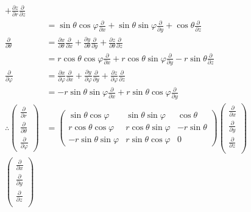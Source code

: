 \documentclass[12pt, UTF8, AutoFakeBold]{ctexart} %
\begin{document}
\begin{align*}
    + \frac{\partial z}{\partial r}\frac{\partial}{\partial z}\\
    &= \sin\theta\cos\varphi\frac{\partial}{\partial x}
    + \sin\theta\sin\varphi\frac{\partial}{\partial y}
    + \cos\theta\frac{\partial}{\partial z}\\
    \frac{\partial}{\partial\theta} &= \frac{\partial x}{\partial\theta}\frac{\partial}{\partial x}
    + \frac{\partial y}{\partial\theta}\frac{\partial}{\partial y}
    + \frac{\partial z}{\partial\theta}\frac{\partial}{\partial z}\\
    &= r\cos\theta\cos\varphi\frac{\partial}{\partial x}
    + r\cos\theta\sin\varphi\frac{\partial}{\partial y}
    - r\sin\theta\frac{\partial}{\partial z}\\
    \frac{\partial}{\partial\varphi} &= \frac{\partial x}{\partial\varphi}\frac{\partial}{\partial x}
    + \frac{\partial y}{\partial\varphi}\frac{\partial}{\partial y}
    + \frac{\partial z}{\partial\varphi}\frac{\partial}{\partial z}\\
    &= -r\sin\theta\sin\varphi\frac{\partial}{\partial x}
    + r\sin\theta\cos\varphi\frac{\partial}{\partial y}\\
    \therefore
    \begin{pmatrix}
        \frac{\partial}{\partial r}\\
        \frac{\partial}{\partial\theta}\\
        \frac{\partial}{\partial\varphi}
    \end{pmatrix}
    &=
    \begin{pmatrix}
        \sin\theta\cos\varphi & \sin\theta\sin\varphi & \cos\theta\\
        r\cos\theta\cos\varphi & r\cos\theta\sin\varphi & -r\sin\theta\\
        -r\sin\theta\sin\varphi & r\sin\theta\cos\varphi & 0
    \end{pmatrix}
    \begin{pmatrix}
        \frac{\partial}{\partial x}\\
        \frac{\partial}{\partial y}\\
        \frac{\partial}{\partial z}\\
    \end{pmatrix}\\
    \begin{pmatrix}
        \frac{\partial}{\partial x}\\
        \frac{\partial}{\partial y}\\
        \frac{\partial}{\partial z}\\

\end{pmatrix}
\end{align*}
\end{document}
